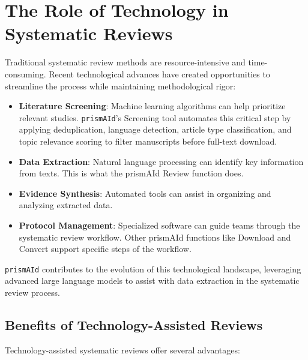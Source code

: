 \section{The Role of Technology in Systematic Reviews}

Traditional systematic review methods are resource-intensive and time-consuming. Recent technological advances have created opportunities to streamline the process while maintaining methodological rigor:

\begin{itemize}
    \item \textbf{Literature Screening}: Machine learning algorithms can help prioritize relevant studies. \texttt{prismAId}'s Screening tool automates this critical step by applying deduplication, language detection, article type classification, and topic relevance scoring to filter manuscripts before full-text download.
    \item \textbf{Data Extraction}: Natural language processing can identify key information from texts. This is what the prismAId Review function does.
    \item \textbf{Evidence Synthesis}: Automated tools can assist in organizing and analyzing extracted data.
    \item \textbf{Protocol Management}: Specialized software can guide teams through the systematic review workflow. Other prismAId functions like Download and Convert support specific steps of the workflow.
\end{itemize}

\texttt{prismAId} contributes to the evolution of this technological landscape, leveraging advanced large language models to assist with data extraction in the systematic review process.

\subsection{Benefits of Technology-Assisted Reviews}

Technology-assisted systematic reviews offer several advantages:

